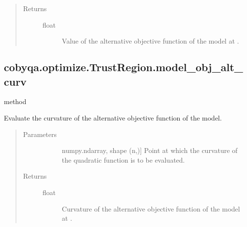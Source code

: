 \documentclass[letterpaper,10pt,english]{sphinxmanual}
\begin{document}
\begin{fulllineitems}
\begin{fulllineitems}
\begin{quote}
\begin{description}
\begin{description}
\end{description}

\item[{Returns}] \leavevmode\begin{description}
\item[{float}] \leavevmode
\sphinxAtStartPar
Value of the alternative objective function of the model at .

\end{description}

\end{description}\end{quote}

\end{fulllineitems}



\subsection{cobyqa.optimize.TrustRegion.model\_obj\_alt\_curv}
\label{\detokenize{refs/generated/cobyqa.optimize.TrustRegion.model_obj_alt_curv:cobyqa-optimize-trustregion-model-obj-alt-curv}}\label{\detokenize{refs/generated/cobyqa.optimize.TrustRegion.model_obj_alt_curv::doc}}
\sphinxAtStartPar
method

\begin{fulllineitems}
\label{\detokenize{refs/generated/cobyqa.optimize.TrustRegion.model_obj_alt_curv:cobyqa.optimize.TrustRegion.model_obj_alt_curv}}
\sphinxAtStartPar
Evaluate the curvature of the alternative objective function of the
model.
\begin{quote}\begin{description}
\item[{Parameters}] \leavevmode\begin{description}
\item[{}] \leavevmode{[}numpy.ndarray, shape (n,){]}
\sphinxAtStartPar
Point at which the curvature of the quadratic function is to be
evaluated.

\end{description}

\item[{Returns}] \leavevmode\begin{description}
\item[{float}] \leavevmode
\sphinxAtStartPar
Curvature of the alternative objective function of the model at .


\end{description}
\end{description}
\end{quote}
\end{fulllineitems}
\end{fulllineitems}
\end{document}
